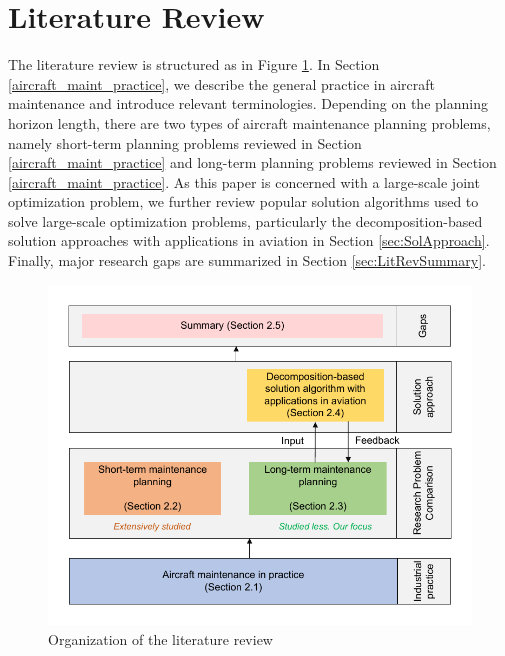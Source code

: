 \section{Literature Review} 
\label{section:liteReview}

The literature review is structured as in Figure \ref{fig:org_lit_review}. In Section \ref{aircraft_maint_practice}, we describe the general practice in aircraft maintenance and introduce relevant terminologies. Depending on the planning horizon length, there are two types of aircraft maintenance planning problems, namely short-term planning problems reviewed in Section \ref{aircraft_maint_practice} and long-term planning problems reviewed in Section \ref{aircraft_maint_practice}. As this paper is concerned with a large-scale joint optimization problem, we further review popular solution algorithms used to solve large-scale optimization problems, particularly the decomposition-based solution approaches with applications in aviation in Section \ref{sec:SolApproach}. Finally, major research gaps are summarized in Section \ref{sec:LitRevSummary}.


\begin{figure}[htbp]
    \centering
    \includegraphics[width=0.65\linewidth]{literature_framework.pdf}
    \caption{Organization of the literature review}
    \label{fig:org_lit_review}
\end{figure}



